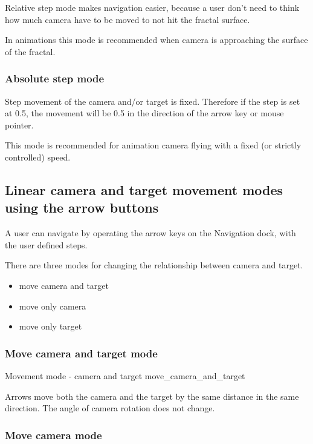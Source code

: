 Relative step mode makes navigation easier, because a user don't need to think
how much camera have to be moved to not hit the fractal surface.

In animations this mode is recommended when camera is approaching the surface of
the fractal.

\subsubsection{Absolute step mode}\label{absolute-step-mode}

Step movement of the camera and/or target is fixed. Therefore if the step is set
at 0.5, the movement will be 0.5 in the direction of the arrow key or mouse
pointer.

This mode is recommended for animation camera flying with a fixed (or strictly
controlled) speed.

\subsection{Linear camera and target movement modes using the arrow
	buttons}\label{linear-camera-and-target-movement-modes-using-the-arrow-buttons}

A user can navigate by operating the arrow keys on the Navigation dock, with the
user defined steps.

There are three modes for changing the relationship between camera and target.
\begin{itemize}
	\item move camera and target
	\item move only camera
	\item move only target
\end{itemize}

\subsubsection{Move camera and target mode}\label{move-camera-and-target-mode}

{Movement mode - camera and target}
{move_camera_and_target}

Arrows move both the camera and the target by the same distance in the same
direction. The angle of camera rotation does not change.

\subsubsection{Move camera mode}\label{move-camera-mode}

